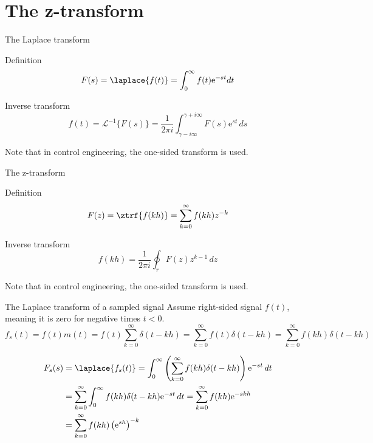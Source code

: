 \documentclass[presentation,aspectratio=169]{beamer}
\begin{document}
\section{The z-transform}
\label{sec:org7595ced}
\begin{frame}[label={sec:org6edb4b7}]{The Laplace transform}
\begin{block}{Definition}
\[ F(s) = \laplace{f(t)} = \int_0^\infty f(t) \mathrm{e}^{-st} dt\]
\end{block}
\begin{block}{Inverse transform}
\[ f(t) = \mathcal{L}^{-1}\{F(s)\} = \frac{1}{2\pi i} \int_{\gamma - i\infty}^{\gamma + i\infty} F(s)\mathrm{e}^{st} \, ds \]

Note that in control engineering, the one-sided transform is used.
\end{block}
\end{frame}

\begin{frame}[label={sec:org50832cf}]{The z-transform}
\begin{block}{Definition}
\[ F(z) = \ztrf{f(kh)} = \sum_{k=0}^{\infty} f(kh)z^{-k} \]
\end{block}

\begin{block}{Inverse transform}
\[ f(kh) = \frac{1}{2\pi i} \oint_r F(z) z^{k-1} \, dz \]

Note that in control engineering, the one-sided transform is used.
\end{block}
\end{frame}

\begin{frame}[label={sec:orgd9b9d0a}]{The Laplace transform of a sampled signal}
Assume right-sided signal \(f(t)\), meaning it is zero for negative times \(t<0\).
\[f_s(t) = f(t)m(t) = f(t) \sum_{k=0}^{\infty} \delta(t-kh) = \sum_{k=0}^{\infty} f(t)\delta(t-kh) = \sum_{k=0}^{\infty} f(kh) \delta(t-kh) \]

\pause

\begin{align*}
F_s(s) &= \laplace{f_s(t)} = \int_0^\infty \left(\sum_{k=0}^{\infty} f(kh) \delta(t-kh)\right)\mathrm{e}^{-st}\, dt \\
&= \sum_{k=0}^{\infty} \int_0^\infty  f(kh) \delta(t-kh) \mathrm{e}^{-st}\, dt = \sum_{k=0}^{\infty} f(kh) \mathrm{e}^{-skh}\\
&= \sum_{k=0}^{\infty} f(kh) \left(\mathrm{e}^{sh}\right)^{-k}
\end{align*}
\end{frame}
\end{document}
